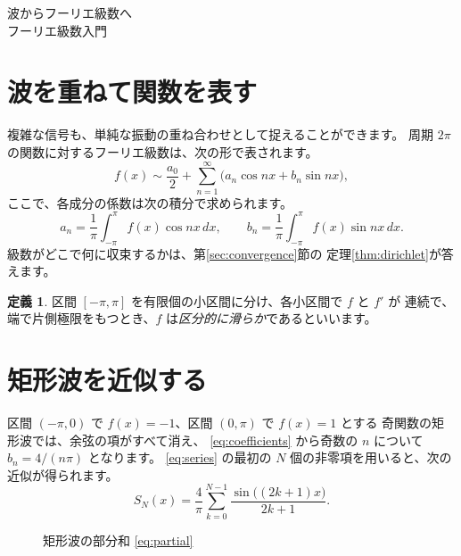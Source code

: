 \documentclass[11pt,a4paper]{ltjsarticle}
\theoremstyle{definition}
\newtheorem{definition}{定義}
\begin{document}
\begin{center}
  {\LARGE 波からフーリエ級数へ}\\[0.5em]
  {\small フーリエ級数入門}
\end{center}

\section{波を重ねて関数を表す}\label{sec:waves}
複雑な信号も、単純な振動の重ね合わせとして捉えることができます。
周期 $2\pi$ の関数に対するフーリエ級数は、次の形で表されます。
\begin{equation}\label{eq:series}
  f(x) \sim \frac{a_0}{2}
  + \sum_{n=1}^{\infty}
    \bigl(a_n\cos nx + b_n\sin nx\bigr),
\end{equation}
ここで、各成分の係数は次の積分で求められます。
\begin{equation}\label{eq:coefficients}
  a_n = \frac{1}{\pi}\int_{-\pi}^{\pi}f(x)\cos nx\,dx,
  \qquad
  b_n = \frac{1}{\pi}\int_{-\pi}^{\pi}f(x)\sin nx\,dx.
\end{equation}
級数がどこで何に収束するかは、第\ref{sec:convergence}節の
定理\ref{thm:dirichlet}が答えます。

\begin{definition}\label{def:piecewise}
区間 $[-\pi,\pi]$ を有限個の小区間に分け、各小区間で $f$ と $f'$ が
連続で、端で片側極限をもつとき、$f$ は\emph{区分的に滑らか}であるといいます。
\end{definition}

\section{矩形波を近似する}\label{sec:square}
区間 $(-\pi,0)$ で $f(x)=-1$、区間 $(0,\pi)$ で $f(x)=1$ とする
奇関数の矩形波では、余弦の項がすべて消え、
\eqref{eq:coefficients} から奇数の $n$ について $b_n=4/(n\pi)$ となります。
\eqref{eq:series} の最初の $N$ 個の非零項を用いると、次の近似が得られます。
\begin{equation}\label{eq:partial}
  S_N(x)=\frac{4}{\pi}\sum_{k=0}^{N-1}
  \frac{\sin\bigl((2k+1)x\bigr)}{2k+1}.
\end{equation}

\begin{figure}[ht]
\centering
{}
\caption{矩形波の部分和 \eqref{eq:partial}}\label{fig:square}
\end{figure}
\end{document}

